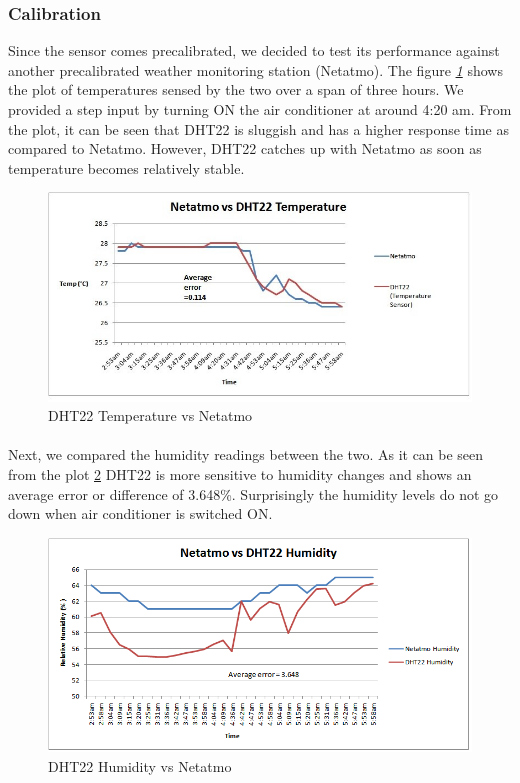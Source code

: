 \documentclass[a4paper,12pt]{article}
\begin{document}
\subsubsection{Calibration}
Since the sensor comes precalibrated, we decided to test its performance against another precalibrated weather monitoring station (Netatmo). 
\newline
The figure \emph{\ref{fig:temp}} shows the plot of temperatures sensed by the two over a span of three hours. We provided a step input by turning ON the air conditioner at around 4:20 am. From the plot, it can be seen that DHT22 is sluggish and has a higher response time as compared to Netatmo. However, DHT22 catches up with Netatmo as soon as temperature becomes relatively stable.
\begin{figure}[!ht]
\centering
\includegraphics[scale=0.5]{dht_temp.jpg}
\caption{DHT22 Temperature vs Netatmo}
\label{fig:temp}
\end{figure}

\paragraph*{}
Next, we compared the humidity readings between the two. As it can be seen from the plot \ref{fig:hum} DHT22 is more sensitive to humidity changes and shows an average error or difference of
3.648\%. Surprisingly the humidity levels do not go down when air conditioner is switched ON.
\begin{figure}[!ht]
\centering
\includegraphics[scale=0.5]{dht_humdity.png}
\caption{DHT22 Humidity vs Netatmo}
\label{fig:hum}
\end{figure}
\end{document}

